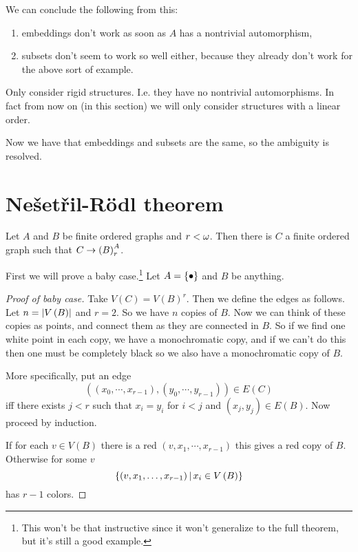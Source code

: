 \documentclass{amsart}
\begin{document}
We can conclude the following from this:
\begin{enumerate}
\item embeddings don't work as soon as $A$ has a nontrivial automorphism,
\item subsets don't seem to work so well either, because they already don't work for the
above sort of example.
\end{enumerate}

\begin{sol}
Only consider rigid structures. I.e. they have no nontrivial automorphisms.
In fact from now on (in this section) we will only consider structures with a linear
order.
\end{sol}

Now we have that embeddings and subsets are the same, so the ambiguity is resolved.

\section{Ne\v{s}et\v{r}il-R\"odl theorem}

\begin{thm}
Let $A$ and $B$ be finite ordered graphs and $r<\omega$.
Then there is $C$ a finite ordered graph
such that $C\rightarrow \left( B \right)_r^A$.
\end{thm}

First we will prove a baby case.\footnote{This won't be that instructive since it won't
generalize to the full theorem, but it's still a good example.}
Let $A = \left\{ \bullet \right\}$ and $B$ be anything.

\begin{proof}[Proof of baby case]
Take $V\left( C \right) = V\left( B \right)^r$. Then we define the edges as follows.
Let $n = \left| V\left( B \right) \right|$ and $r = 2$. So we have $n$ copies of $B$.
Now we can think of these copies as points, and connect them as they are connected in $B$.
So if we find one white point in each copy, we have a monochromatic copy, and if we can't
do this then one must be completely black so we also have a monochromatic copy of $B$.

More specifically, put an edge 
\begin{equation}
\left( \left( x_0 , \cdots , x_{r-1} \right) , \left( y_0 , \cdots , y_{r-1}
\right)\right)\in E\left( C \right)
\end{equation}
iff there exists $j<r$ such that
$x_i = y_i$ for $i < j$ and
$\left( x_j , y_j \right)\in E\left( B \right)$.
Now proceed by induction.

If for each $v\in V\left( B \right)$ there is a red $\left( v , x_1 , \cdots , x_{r-1}
\right)$ this gives a red copy of $B$. 
Otherwise for some $v$ 
\begin{equation}
\left\{ \left( v , x_1 , \ldots , x_{r-1} \right) \, \middle\vert \, x_i\in V\left( B \right) \right\}
\end{equation}
has $r-1$ colors.
\end{proof}
\end{document}
